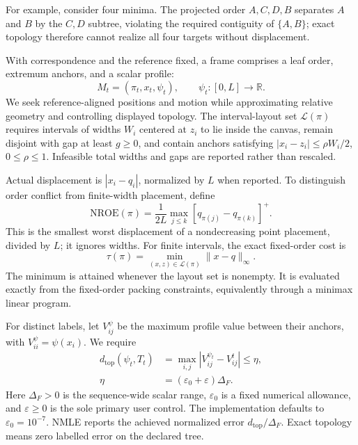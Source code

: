 \documentclass[review]{vgtc}
\newcommand{\dtop}{d_{\mathrm{top}}}
\newcommand{\nroe}{\mathrm{NROE}}
\begin{document}
For example, consider four minima. The projected order $A,C,D,B$ separates $A$ and $B$ by the $C,D$ subtree, violating the required contiguity of $\{A,B\}$; exact topology therefore cannot realize all four targets without displacement.

With correspondence and the reference fixed, a frame comprises a leaf order, extremum anchors, and a scalar profile:
\begin{equation}\label{eq:mapframe}
 M_t=(\pi_t,x_t,\psi_t),\qquad\psi_t:[0,L]\to\mathbb{R}.
\end{equation}
We seek reference-aligned positions and motion while approximating relative geometry and controlling displayed topology. The interval-layout set $\mathcal{L}(\pi)$ requires intervals of widths $W_i$ centered at $z_i$ to lie inside the canvas, remain disjoint with gap at least $g\ge0$, and contain anchors satisfying $|x_i-z_i|\le\rho W_i/2$, $0\le\rho\le1$. Infeasible total widths and gaps are reported rather than rescaled.

Actual displacement is $|x_i-q_i|$, normalized by $L$ when reported. To distinguish order conflict from finite-width placement, define
\begin{equation}\label{eq:nroe}
 \nroe(\pi)=\frac{1}{2L}\max_{j\le k}
                      [q_{\pi(j)}-q_{\pi(k)}]^+.
\end{equation}
This is the smallest worst displacement of a nondecreasing point placement, divided by $L$; it ignores widths. For finite intervals, the exact fixed-order cost is
\begin{equation}\label{eq:tau}
 \tau(\pi)=\min_{(x,z)\in\mathcal{L}(\pi)}\|x-q\|_\infty.
\end{equation}
The minimum is attained whenever the layout set is nonempty. It is evaluated exactly from the fixed-order packing constraints, equivalently through a minimax linear program.

For distinct labels, let $V_{ij}^{\psi}$ be the maximum profile value between their anchors, with $V_{ii}^{\psi}=\psi(x_i)$. We require
\begin{equation}\label{eq:dtop}
\begin{aligned}
 \dtop(\psi_t,T_t)&=\max_{i,j}|V_{ij}^{\psi_t}-V_{ij}^t|\le\eta,\\
 \eta&=(\varepsilon_0+\varepsilon)\Delta_F.
\end{aligned}
\end{equation}
Here $\Delta_F>0$ is the sequence-wide scalar range, $\varepsilon_0$ is a fixed numerical allowance, and $\varepsilon\ge0$ is the sole primary user control. The implementation defaults to $\varepsilon_0=10^{-7}$. NMLE reports the achieved normalized error $\dtop/\Delta_F$. Exact topology means zero labelled error on the declared tree.
\end{document}
